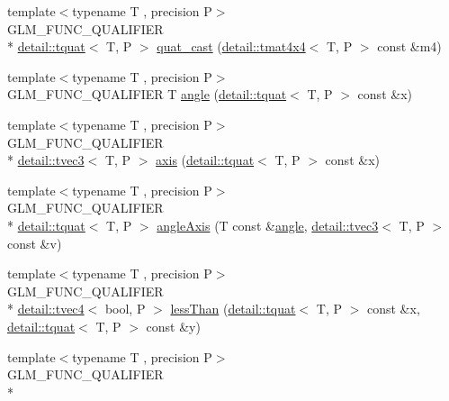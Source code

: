 \begin{DoxyCompactItemize}
\item 
{\footnotesize template$<$typename T , precision P$>$ }\\G\-L\-M\-\_\-\-F\-U\-N\-C\-\_\-\-Q\-U\-A\-L\-I\-F\-I\-E\-R \\*
\hyperlink{structglm_1_1detail_1_1tquat}{detail\-::tquat}$<$ T, P $>$ \hyperlink{group__gtc__quaternion_ga385af22ef1a45c4464ddd28b80d5ce18}{quat\-\_\-cast} (\hyperlink{structglm_1_1detail_1_1tmat4x4}{detail\-::tmat4x4}$<$ T, P $>$ const \&m4)
\item 
{\footnotesize template$<$typename T , precision P$>$ }\\G\-L\-M\-\_\-\-F\-U\-N\-C\-\_\-\-Q\-U\-A\-L\-I\-F\-I\-E\-R T \hyperlink{group__gtc__quaternion_ga23a3fc7ada5bbb665ff84c92c6e0542c}{angle} (\hyperlink{structglm_1_1detail_1_1tquat}{detail\-::tquat}$<$ T, P $>$ const \&x)
\item 
{\footnotesize template$<$typename T , precision P$>$ }\\G\-L\-M\-\_\-\-F\-U\-N\-C\-\_\-\-Q\-U\-A\-L\-I\-F\-I\-E\-R \\*
\hyperlink{structglm_1_1detail_1_1tvec3}{detail\-::tvec3}$<$ T, P $>$ \hyperlink{group__gtc__quaternion_ga8eef9f8c3f2e4836dccf09df975b20fb}{axis} (\hyperlink{structglm_1_1detail_1_1tquat}{detail\-::tquat}$<$ T, P $>$ const \&x)
\item 
{\footnotesize template$<$typename T , precision P$>$ }\\G\-L\-M\-\_\-\-F\-U\-N\-C\-\_\-\-Q\-U\-A\-L\-I\-F\-I\-E\-R \\*
\hyperlink{structglm_1_1detail_1_1tquat}{detail\-::tquat}$<$ T, P $>$ \hyperlink{group__gtc__quaternion_ga771b3e16cca8324e7111b923476be666}{angle\-Axis} (T const \&\hyperlink{group__gtc__quaternion_ga23a3fc7ada5bbb665ff84c92c6e0542c}{angle}, \hyperlink{structglm_1_1detail_1_1tvec3}{detail\-::tvec3}$<$ T, P $>$ const \&v)
\item 
{\footnotesize template$<$typename T , precision P$>$ }\\G\-L\-M\-\_\-\-F\-U\-N\-C\-\_\-\-Q\-U\-A\-L\-I\-F\-I\-E\-R \\*
\hyperlink{structglm_1_1detail_1_1tvec4}{detail\-::tvec4}$<$ bool, P $>$ \hyperlink{group__gtc__quaternion_ga4e4c37b86cecde7e1076c5b5fdb920b9}{less\-Than} (\hyperlink{structglm_1_1detail_1_1tquat}{detail\-::tquat}$<$ T, P $>$ const \&x, \hyperlink{structglm_1_1detail_1_1tquat}{detail\-::tquat}$<$ T, P $>$ const \&y)
\item 
{\footnotesize template$<$typename T , precision P$>$ }\\G\-L\-M\-\_\-\-F\-U\-N\-C\-\_\-\-Q\-U\-A\-L\-I\-F\-I\-E\-R \\*

\end{DoxyCompactItemize}
